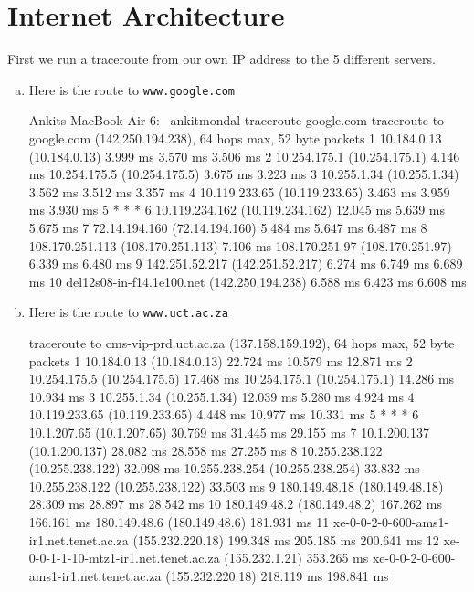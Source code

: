 \section{Internet Architecture}

First we run a traceroute from our own IP address to the 5 different servers.

\begin{enumerate}[a.]

\item Here is the route to {\tt www.google.com}
\begin{code}
Ankits-MacBook-Air-6:~ ankitmondal traceroute google.com
traceroute to google.com (142.250.194.238), 64 hops max, 52 byte packets
 1  10.184.0.13 (10.184.0.13)  3.999 ms  3.570 ms  3.506 ms
 2  10.254.175.1 (10.254.175.1)  4.146 ms
    10.254.175.5 (10.254.175.5)  3.675 ms  3.223 ms
 3  10.255.1.34 (10.255.1.34)  3.562 ms  3.512 ms  3.357 ms
 4  10.119.233.65 (10.119.233.65)  3.463 ms  3.959 ms  3.930 ms
 5  * * *
 6  10.119.234.162 (10.119.234.162)  12.045 ms  5.639 ms  5.675 ms
 7  72.14.194.160 (72.14.194.160)  5.484 ms  5.647 ms  6.487 ms
 8  108.170.251.113 (108.170.251.113)  7.106 ms
    108.170.251.97 (108.170.251.97)  6.339 ms  6.480 ms
 9  142.251.52.217 (142.251.52.217)  6.274 ms  6.749 ms  6.689 ms
10  del12s08-in-f14.1e100.net (142.250.194.238)  6.588 ms  6.423 ms  6.608 ms
\end{code}
\item Here is the route to {\tt www.uct.ac.za}
\begin{code}
traceroute to cms-vip-prd.uct.ac.za (137.158.159.192), 64 hops max, 52 byte packets
 1  10.184.0.13 (10.184.0.13)  22.724 ms  10.579 ms  12.871 ms
 2  10.254.175.5 (10.254.175.5)  17.468 ms
    10.254.175.1 (10.254.175.1)  14.286 ms  10.934 ms
 3  10.255.1.34 (10.255.1.34)  12.039 ms  5.280 ms  4.924 ms
 4  10.119.233.65 (10.119.233.65)  4.448 ms  10.977 ms  10.331 ms
 5  * * *
 6  10.1.207.65 (10.1.207.65)  30.769 ms  31.445 ms  29.155 ms
 7  10.1.200.137 (10.1.200.137)  28.082 ms  28.558 ms  27.255 ms
 8  10.255.238.122 (10.255.238.122)  32.098 ms
    10.255.238.254 (10.255.238.254)  33.832 ms
    10.255.238.122 (10.255.238.122)  33.503 ms
 9  180.149.48.18 (180.149.48.18)  28.309 ms  28.897 ms  28.542 ms
10  180.149.48.2 (180.149.48.2)  167.262 ms  166.161 ms
    180.149.48.6 (180.149.48.6)  181.931 ms
11  xe-0-0-2-0-600-ams1-ir1.net.tenet.ac.za (155.232.220.18)  199.348 ms  205.185 ms  200.641 ms
12  xe-0-0-1-1-10-mtz1-ir1.net.tenet.ac.za (155.232.1.21)  353.265 ms
    xe-0-0-2-0-600-ams1-ir1.net.tenet.ac.za (155.232.220.18)  218.119 ms  198.841 ms

\end{code}
\end{enumerate}
